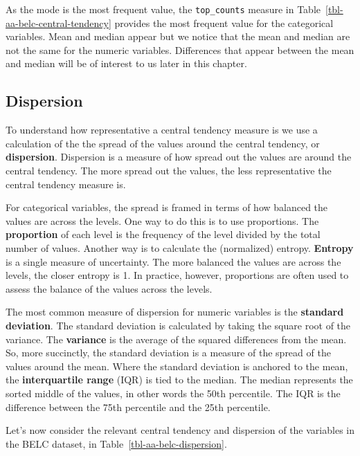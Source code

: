 \documentclass[
  letterpaper,
]{latex/krantz}
\theoremstyle{definition}
\theoremstyle{remark}
\begin{document}
As the mode is the most frequent value, the \texttt{top\_counts} measure
in Table~\ref{tbl-aa-belc-central-tendency} provides the most frequent
value for the categorical variables. Mean and median appear but we
notice that the mean and median are not the same for the numeric
variables. Differences that appear between the mean and median will be
of interest to us later in this chapter.

\subsection{Dispersion}\label{dispersion}

To understand how representative a central tendency measure is we use a
calculation of the the spread of the values around the central tendency,
or \textbf{dispersion}. Dispersion is a measure of how spread out the
values are around the central tendency. The more spread out the values,
the less representative the central tendency measure is.

For categorical variables, the spread is framed in terms of how balanced
the values are across the levels. One way to do this is to use
proportions. The \textbf{proportion} of each level is the frequency of
the level divided by the total number of values. Another way is to
calculate the (normalized) entropy. \textbf{Entropy} is a single measure
of uncertainty. The more balanced the values are across the levels, the
closer entropy is 1. In practice, however, proportions are often used to
assess the balance of the values across the levels.

The most common measure of dispersion for numeric variables is the
\textbf{standard deviation}. The standard deviation is calculated by
taking the square root of the variance. The \textbf{variance} is the
average of the squared differences from the mean. So, more succinctly,
the standard deviation is a measure of the spread of the values around
the mean. Where the standard deviation is anchored to the mean, the
\textbf{interquartile range} (IQR) is tied to the median. The median
represents the sorted middle of the values, in other words the 50th
percentile. The IQR is the difference between the 75th percentile and
the 25th percentile.

Let's now consider the relevant central tendency and dispersion of the
variables in the BELC dataset, in Table~\ref{tbl-aa-belc-dispersion}.
\end{document}
